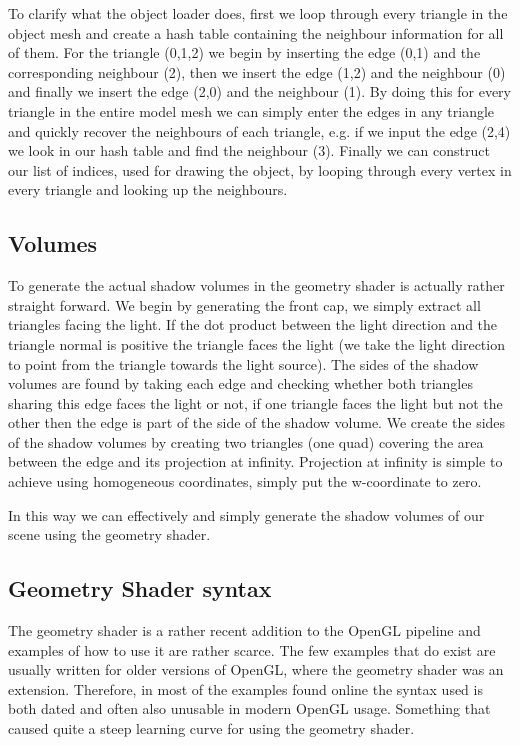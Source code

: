 \documentclass[a4paper, 12pt]{article}
\begin{document}
To clarify what the object loader does, first we loop through every triangle in
the object mesh and create a hash table containing the neighbour information for
all of them. For the triangle (0,1,2) we begin by inserting the edge (0,1) and
the corresponding neighbour (2), then we insert the edge (1,2) and the
neighbour (0) and finally we insert the edge (2,0) and the neighbour (1). By
doing this for every triangle in the entire model mesh we can simply enter the
edges in any triangle and quickly recover the neighbours of each triangle, e.g.
if we input the edge (2,4) we look in our hash table and find the neighbour
(3). Finally we can construct our list of indices, used for drawing the object,
by looping through every vertex in every triangle and looking up the neighbours.

\subsection{Volumes}
To generate the actual shadow volumes in the geometry shader is actually rather straight forward. We begin by generating the front cap, we simply extract all triangles facing the light. If the dot product between the light direction and the triangle normal is positive the triangle faces the light (we take the light direction to point from the triangle towards the light source). The sides of the shadow volumes are found by taking each edge and checking whether both triangles sharing this edge faces the light or not, if one triangle faces the light but not the other then the edge is part of the side of the shadow volume. We create the sides of the shadow volumes by creating two triangles (one quad) covering the area between the edge and its projection at infinity. Projection at infinity is simple to achieve using homogeneous coordinates, simply put the w-coordinate to zero.

In this way we can effectively and simply generate the shadow volumes of our scene using the geometry shader.

\subsection{Geometry Shader syntax}
The geometry shader is a rather recent addition to the OpenGL pipeline and examples of how to use it are rather scarce. The few examples that do exist are usually written for older versions of OpenGL, where the geometry shader was an extension. Therefore, in most of the examples found online the syntax used is both dated and often also unusable in modern OpenGL usage. Something that caused quite a steep learning curve for using the geometry shader.
\end{document}
